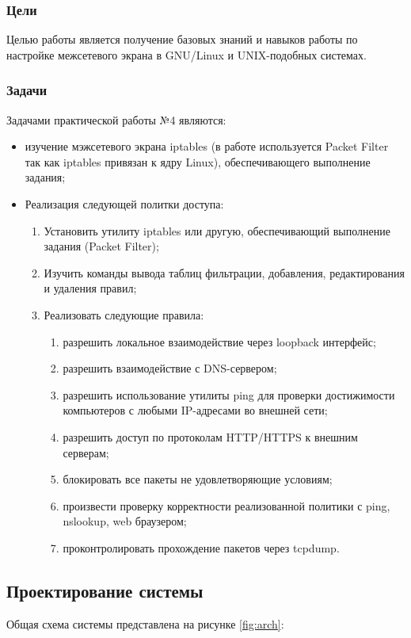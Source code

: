 \documentclass[areasetadvanced]{scrartcl}
\begin{document}
\subsubsection{Цели}
Целью работы является получение базовых знаний и навыков работы по настройке межсетевого экрана 
в GNU/Linux и UNIX-подобных системах.
\subsubsection{Задачи}
Задачами практической работы №4 являются:
\begin{itemize}
    \item изучение мэжсетевого экрана iptables (в работе используется Packet Filter так как iptables привязан к ядру Linux), обеспечивающего выполнение задания;
    \item Реализация следующей политки доступа: \begin{enumerate}
            \item Установить утилиту iptables или другую, обеспечивающий выполнение задания (Packet Filter);
            \item Изучить команды вывода таблиц фильтрации, добавления, редактирования и удаления правил;
            \item Реализовать следующие правила: \begin{enumerate}
                \item разрешить локальное взаимодействие через loopback интерфейс;
                \item разрешить взаимодействие с DNS-сервером;
                \item разрешить использование утилиты ping для проверки достижимости компьютеров с любыми IP-адресами во внешней сети;
                \item разрешить доступ по протоколам HTTP/HTTPS к внешним серверам;
                \item блокировать все пакеты не удовлетворяющие условиям;
                \item произвести проверку корректности реализованной политики с ping, nslookup, web браузером;
                \item проконтролировать прохождение пакетов через tcpdump.
            \end{enumerate}
        \end{enumerate}
\end{itemize}

\subsection{Проектирование системы}
Общая схема системы представлена на рисунке \ref{fig:arch}: 
\end{document}
